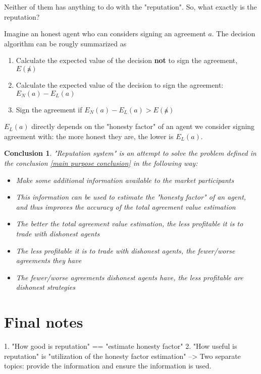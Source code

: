 \documentclass{article}
\newtheorem{conclusion}{Conclusion}[section]
\begin{document}
Neither of them has anything to do with the "reputation". So, what exactly is the reputation?

Imagine an honest agent who can considers signing an agreement $a$. The decision algorithm can be rougly summarized as
\begin{enumerate}
\item{Calculate the expected value of the decision \textbf{not} to sign the agreement, $E(\not a)$}
\item{Calculate the expected value of the decision to sign the agreement: $E_N(a) - E_L(a)$}
\item{Sign the agreement if $E_N(a) - E_L(a) > E(\not a)$}
\end{enumerate}

$E_L(a)$ directly depends on the "honesty factor" of an agent we consider signing agreement with: the more honest they are, the lower is $E_L(a)$.

\begin{conclusion}

"Reputation system" is an attempt to solve the problem defined in the conclusion \ref{main purpose conclusion} in the following way:

\begin{itemize}
    \item{Make some additional information available to the market participants}
    \item{This information can be used to estimate the "honesty factor" of an agent, and thus improves the accuracy of the total agreement value estimation}
    \item{The better the total agreement value estimation, the less profitable it is to trade with dishonest agents}
    \item{The less profitable it is to trade with dishonest agents, the fewer/worse agreements they have}
    \item{The fewer/worse agreements dishonest agents have, the less profitable are dishonest strategies}
\end{itemize}

\end{conclusion}


\section{Final notes}

1. "How good is reputation" == "estimate honesty factor"
2. "How useful is reputation" is "utilization of the honesty factor estimation"
--> Two separate topics: provide the information and ensure the information is used.
\end{document}
